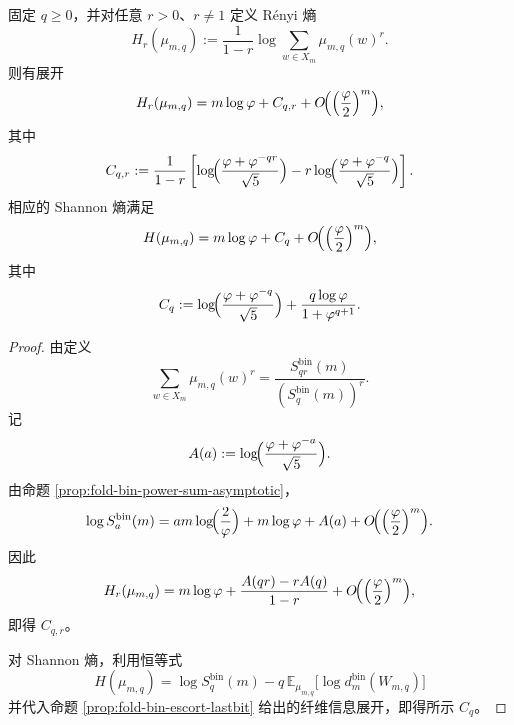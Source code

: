 \begin{theorem}\label{thm:xi-fold-escort-renyi-shannon-constants}
固定 \(q\ge 0\)，并对任意 \(r>0\)、\(r\neq 1\) 定义 Rényi 熵
\[
H_r(\mu_{m,q}):=\frac{1}{1-r}\log\sum_{w\in X_m}\mu_{m,q}(w)^r.
\]
则有展开
\[
H_r(\mu_{m,q})=m\log\varphi+C_{q,r}+O\!\Bigl(\Bigl(\frac{\varphi}{2}\Bigr)^m\Bigr),
\]
其中
\[
C_{q,r}
:=
\frac{1}{1-r}\left[
\log\!\Bigl(\frac{\varphi+\varphi^{-qr}}{\sqrt5}\Bigr)
-r\log\!\Bigl(\frac{\varphi+\varphi^{-q}}{\sqrt5}\Bigr)
\right].
\]
相应的 Shannon 熵满足
\[
H(\mu_{m,q})=m\log\varphi+C_q+O\!\Bigl(\Bigl(\frac{\varphi}{2}\Bigr)^m\Bigr),
\]
其中
\[
C_q
:=
\log\!\Bigl(\frac{\varphi+\varphi^{-q}}{\sqrt5}\Bigr)
+\frac{q\log\varphi}{1+\varphi^{q+1}}.
\]
\end{theorem}
\begin{proof}
由定义
\[
\sum_{w\in X_m}\mu_{m,q}(w)^r=\frac{S_{qr}^{\mathrm{bin}}(m)}{(S_q^{\mathrm{bin}}(m))^r}.
\]
记
\[
A(a):=\log\!\Bigl(\frac{\varphi+\varphi^{-a}}{\sqrt5}\Bigr).
\]
由命题 \ref{prop:fold-bin-power-sum-asymptotic}，
\[
\log S_a^{\mathrm{bin}}(m)
=
am\log\!\Bigl(\frac{2}{\varphi}\Bigr)+m\log\varphi+A(a)
+O\!\Bigl(\Bigl(\frac{\varphi}{2}\Bigr)^m\Bigr).
\]
因此
\[
H_r(\mu_{m,q})
=
m\log\varphi+\frac{A(qr)-rA(q)}{1-r}
+O\!\Bigl(\Bigl(\frac{\varphi}{2}\Bigr)^m\Bigr),
\]
即得 \(C_{q,r}\)。

对 Shannon 熵，利用恒等式
\[
H(\mu_{m,q})=\log S_q^{\mathrm{bin}}(m)-q\,\mathbb E_{\mu_{m,q}}\!\bigl[\log d_m^{\mathrm{bin}}(W_{m,q})\bigr]
\]
并代入命题 \ref{prop:fold-bin-escort-lastbit} 给出的纤维信息展开，即得所示 \(C_q\)。
\end{proof}

